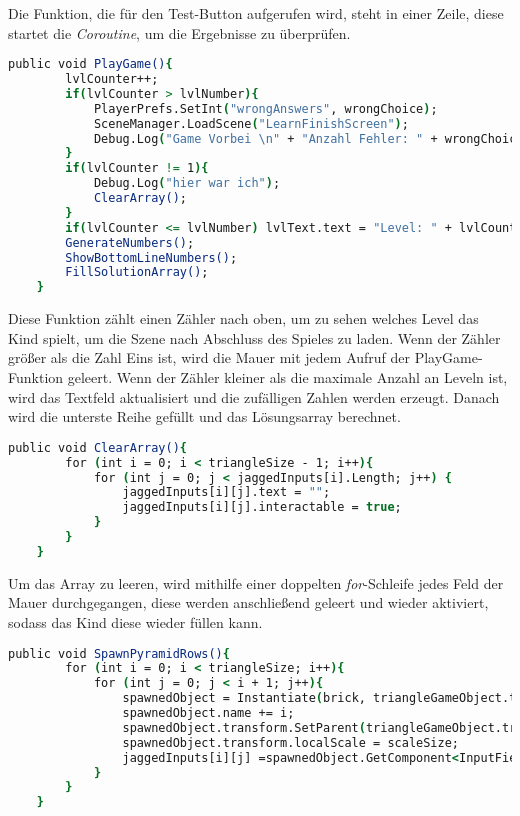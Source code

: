 Die Funktion, die für den Test-Button aufgerufen wird, steht in einer Zeile, diese startet die \textit{Coroutine}, um die Ergebnisse zu überprüfen.\\
\begin{lstlisting}[language=csh, caption={Triangle.cs PlayGame-Funktion}]
	public void PlayGame(){
		lvlCounter++;
		if(lvlCounter > lvlNumber){
			PlayerPrefs.SetInt("wrongAnswers", wrongChoice);
			SceneManager.LoadScene("LearnFinishScreen");
			Debug.Log("Game Vorbei \n" + "Anzahl Fehler: " + wrongChoice);
		}
		if(lvlCounter != 1){
			Debug.Log("hier war ich");
			ClearArray();
		}
		if(lvlCounter <= lvlNumber)	lvlText.text = "Level: " + lvlCounter + "/" + lvlNumber;
		GenerateNumbers();
		ShowBottomLineNumbers();
		FillSolutionArray();
	}
\end{lstlisting}
Diese Funktion zählt einen Zähler nach oben, um zu sehen welches Level das Kind spielt, um die Szene nach Abschluss des Spieles zu laden. Wenn der Zähler größer als die Zahl Eins ist, wird die Mauer mit jedem Aufruf der PlayGame-Funktion geleert. Wenn der Zähler kleiner als die maximale Anzahl an Leveln ist, wird das Textfeld aktualisiert und die zufälligen Zahlen werden erzeugt. Danach wird die unterste Reihe gefüllt und das Lösungsarray berechnet.\begin{lstlisting}[language=csh, caption={Triangle.cs ClearArray-Funktion}]
	public void ClearArray(){
		for (int i = 0; i < triangleSize - 1; i++){
			for (int j = 0; j < jaggedInputs[i].Length; j++) {
				jaggedInputs[i][j].text = "";
				jaggedInputs[i][j].interactable = true;
			}
		}
	}
\end{lstlisting}
Um das Array zu leeren, wird mithilfe einer doppelten \textit{for}-Schleife jedes Feld der Mauer durchgegangen, diese werden anschließend geleert und wieder aktiviert, sodass das Kind diese wieder füllen kann.\\
\begin{lstlisting}[language=csh, caption={Triangle.cs SpawnPyramidRows-Funktion}]
	public void SpawnPyramidRows(){
		for (int i = 0; i < triangleSize; i++){
			for (int j = 0; j < i + 1; j++){
				spawnedObject = Instantiate(brick, triangleGameObject.transform.position, Quaternion.identity);
				spawnedObject.name += i;
				spawnedObject.transform.SetParent(triangleGameObject.transform.GetChild(i));
				spawnedObject.transform.localScale = scaleSize;
				jaggedInputs[i][j] =spawnedObject.GetComponent<InputField>();
			}
		}
	}
\end{lstlisting}
